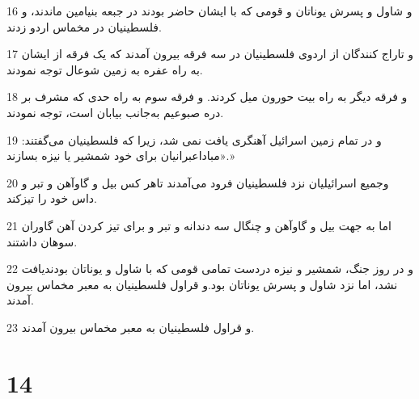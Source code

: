 \par 16 و شاول و پسرش یوناتان و قومی که با ایشان حاضر بودند در جبعه بنیامین ماندند، و فلسطینیان در مخماس اردو زدند. 
\par 17 و تاراج کنندگان از اردوی فلسطینیان در سه فرقه بیرون آمدند که یک فرقه از ایشان به راه عفره به زمین شوعال توجه نمودند.
\par 18 و فرقه دیگر به راه بیت حورون میل کردند. و فرقه سوم به راه حدی که مشرف بر دره صبوعیم به‌جانب بیابان است، توجه نمودند.
\par 19 و در تمام زمین اسرائیل آهنگری یافت نمی شد، زیرا که فلسطینیان می‌گفتند: «مباداعبرانیان برای خود شمشیر یا نیزه بسازند.»
\par 20 وجمیع اسرائیلیان نزد فلسطینیان فرود می‌آمدند تاهر کس بیل و گاوآهن و تبر و داس خود را تیزکند.
\par 21 اما به جهت بیل و گاوآهن و چنگال سه دندانه و تبر و برای تیز کردن آهن گاوران سوهان داشتند.
\par 22 و در روز جنگ، شمشیر و نیزه دردست تمامی قومی که با شاول و یوناتان بودندیافت نشد، اما نزد شاول و پسرش یوناتان بود.و قراول فلسطینیان به معبر مخماس بیرون آمدند.
\par 23 و قراول فلسطینیان به معبر مخماس بیرون آمدند.
 
\chapter{14}

